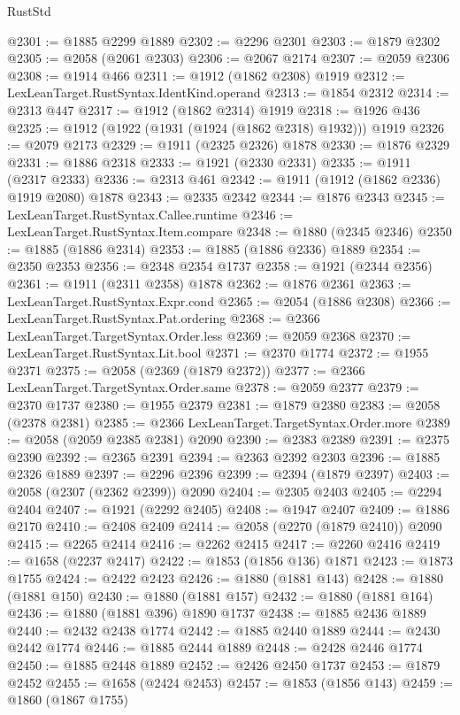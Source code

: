 \begin{lexlean}{RustStd}
\begin{coremodule}
{\begin{coremodule}
{{{{{{{{{{{{{{{{{{{{{{{{{{{{{@2301 := @1885 @2299 @1889
@2302 := @2296 @2301
@2303 := @1879 @2302
@2305 := @2058 (@2061 @2303)
@2306 := @2067 @2174
@2307 := @2059 @2306
@2308 := @1914 @466
@2311 := @1912 (@1862 @2308) @1919
@2312 := LexLeanTarget.RustSyntax.IdentKind.operand
@2313 := @1854 @2312
@2314 := @2313 @447
@2317 := @1912 (@1862 @2314) @1919
@2318 := @1926 @436
@2325 := @1912 (@1922 (@1931 (@1924 (@1862 @2318) @1932))) @1919
@2326 := @2079 @2173
@2329 := @1911 (@2325 @2326) @1878
@2330 := @1876 @2329
@2331 := @1886 @2318
@2333 := @1921 (@2330 @2331)
@2335 := @1911 (@2317 @2333)
@2336 := @2313 @461
@2342 := @1911 (@1912 (@1862 @2336) @1919 @2080) @1878
@2343 := @2335 @2342
@2344 := @1876 @2343
@2345 := LexLeanTarget.RustSyntax.Callee.runtime
@2346 := LexLeanTarget.RustSyntax.Item.compare
@2348 := @1880 (@2345 @2346)
@2350 := @1885 (@1886 @2314)
@2353 := @1885 (@1886 @2336) @1889
@2354 := @2350 @2353
@2356 := @2348 @2354 @1737
@2358 := @1921 (@2344 @2356)
@2361 := @1911 (@2311 @2358) @1878
@2362 := @1876 @2361
@2363 := LexLeanTarget.RustSyntax.Expr.cond
@2365 := @2054 (@1886 @2308)
@2366 := LexLeanTarget.RustSyntax.Pat.ordering
@2368 := @2366 LexLeanTarget.TargetSyntax.Order.less
@2369 := @2059 @2368
@2370 := LexLeanTarget.RustSyntax.Lit.bool
@2371 := @2370 @1774
@2372 := @1955 @2371
@2375 := @2058 (@2369 (@1879 @2372))
@2377 := @2366 LexLeanTarget.TargetSyntax.Order.same
@2378 := @2059 @2377
@2379 := @2370 @1737
@2380 := @1955 @2379
@2381 := @1879 @2380
@2383 := @2058 (@2378 @2381)
@2385 := @2366 LexLeanTarget.TargetSyntax.Order.more
@2389 := @2058 (@2059 @2385 @2381) @2090
@2390 := @2383 @2389
@2391 := @2375 @2390
@2392 := @2365 @2391
@2394 := @2363 @2392 @2303
@2396 := @1885 @2326 @1889
@2397 := @2296 @2396
@2399 := @2394 (@1879 @2397)
@2403 := @2058 (@2307 (@2362 @2399)) @2090
@2404 := @2305 @2403
@2405 := @2294 @2404
@2407 := @1921 (@2292 @2405)
@2408 := @1947 @2407
@2409 := @1886 @2170
@2410 := @2408 @2409
@2414 := @2058 (@2270 (@1879 @2410)) @2090
@2415 := @2265 @2414
@2416 := @2262 @2415
@2417 := @2260 @2416
@2419 := @1658 (@2237 @2417)
@2422 := @1853 (@1856 @136) @1871
@2423 := @1873 @1755
@2424 := @2422 @2423
@2426 := @1880 (@1881 @143)
@2428 := @1880 (@1881 @150)
@2430 := @1880 (@1881 @157)
@2432 := @1880 (@1881 @164)
@2436 := @1880 (@1881 @396) @1890 @1737
@2438 := @1885 @2436 @1889
@2440 := @2432 @2438 @1774
@2442 := @1885 @2440 @1889
@2444 := @2430 @2442 @1774
@2446 := @1885 @2444 @1889
@2448 := @2428 @2446 @1774
@2450 := @1885 @2448 @1889
@2452 := @2426 @2450 @1737
@2453 := @1879 @2452
@2455 := @1658 (@2424 @2453)
@2457 := @1853 (@1856 @143)
@2459 := @1860 (@1867 @1755)
}}}}}}}}}}}}}}}}}}}}}}}}}}}}}
\end{coremodule}}
\end{coremodule}
\end{lexlean}

